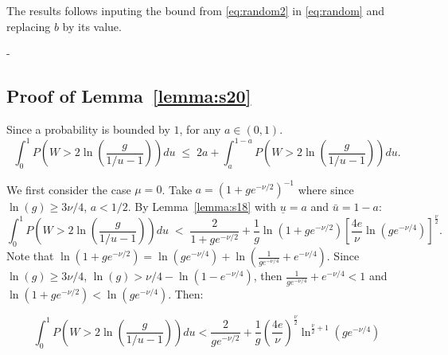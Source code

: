 \documentclass[aos]{imsart}
\theoremstyle{plain}
\begin{document}
\begin{supplement}
The results follows inputing the bound from \eqref{eq:random2} in \eqref{eq:random} and replacing $b$ by its value.


-\subsection{Proof of Lemma~\ref{lemma:s20}}
Since a probability is bounded by $1$, for any $a\in(0,1)$.
\begin{equation}\label{eq:basebound}
    \int_0^1 P\left(W>2 \ln \left(\frac{g}{1 / u-1}\right)\right) d u \;\leq\; 2 a+\int_{a}^{1-a} P\left(W>2\ln\left(\frac{g}{1 / u-1}\right)\right) d u.
\end{equation}

We first consider the case $\mu=0$. Take  $a=\left(1+g e^{-\nu / 2}\right)^{-1}$ where since $\ln(g)\geq 3\nu/4$, $a<1/2$. By Lemma~\ref{lemma:s18} with $\underline{u}=a$ and $\bar{u}=1-a$:
\begin{equation*} 
\int_0^1 P\left(W>2 \ln \left(\frac{g}{1 / u-1}\right)\right) d u \;<\; \frac{2}{1+g e^{-\nu / 2}}+\frac{1}{g} \ln \left(1+g e^{-\nu / 2}\right)\left[\frac{4 e}{\nu} \ln \left(ge^{-\nu / 4}\right)\right]^{\frac{\nu}{2}}.
\end{equation*}
Note that $\ln \left(1+g e^{-\nu / 2}\right) = \ln \left(g e^{-\nu / 4}\right)+\ln \left(\frac{1}{g e^{-\nu / 4}}+ e^{-\nu / 4}\right)$. Since $\ln(g) \geq 3\nu/4$, $\ln(g) > \nu/4-\ln(1-e^{-\nu/4})$, then $\frac{1}{g e^{-\nu / 4}}+ e^{-\nu / 4}<1$ and $\ln \left(1+g e^{-\nu / 2}\right)<\ln \left(g e^{-\nu / 4}\right)$. Then:

\begin{equation*}
\int_0^1 P\left(W>2 \ln \left(\frac{g}{1 / u-1}\right)\right) d u < 
\frac{2}{g e^{-\nu / 2}}+\frac{1}{g} \left(\frac{4 e}{\nu}\right)^{\frac{\nu}{2}} \ln^{\frac{\nu}{2}+1}\left(ge^{-\nu / 4}\right)
\end{equation*}


\end{supplement}
\end{document}
